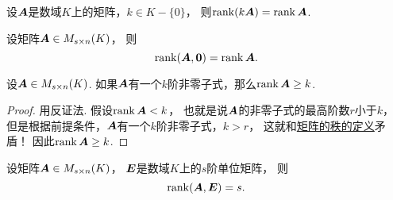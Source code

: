 \begin{property}\label{theorem:线性方程组.矩阵的秩的性质3}
设\(\boldsymbol{A}\)是数域\(K\)上的矩阵，\(k \in K-\{0\}\)，
则\(\rank(k\boldsymbol{A}) = \rank\boldsymbol{A}\).
\end{property}

\begin{property}
设矩阵\(\boldsymbol{A} \in M_{s \times n}(K)\)，
则\begin{equation*}
	\rank(\boldsymbol{A},\boldsymbol0) = \rank\boldsymbol{A}.
\end{equation*}
\end{property}

\begin{theorem}
设\(\boldsymbol{A}\in M_{s \times n}(K)\).
如果\(\boldsymbol{A}\)有一个\(k\)阶非零子式，那么\(\rank\boldsymbol{A}\geq k\).
\begin{proof}
用反证法.
假设\(\rank\boldsymbol{A}<k\)，
也就是说\(\boldsymbol{A}\)的非零子式的最高阶数\(r\)小于\(k\)，
但是根据前提条件，\(\boldsymbol{A}\)有一个\(k\)阶非零子式，\(k>r\)，
这就和\hyperref[definition:线性方程组.矩阵的秩的定义]{矩阵的秩的定义}矛盾！
因此\(\rank\boldsymbol{A}\geq k\).
\end{proof}
\end{theorem}
\begin{corollary}
设矩阵\(\boldsymbol{A} \in M_{s \times n}(K)\)，
\(\boldsymbol{E}\)是数域\(K\)上的\(s\)阶单位矩阵，
则\begin{equation*}
	\rank(\boldsymbol{A},\boldsymbol{E}) = s.
\end{equation*}
\end{corollary}

